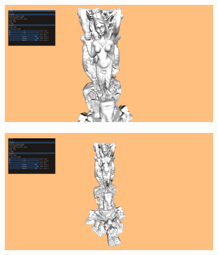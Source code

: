 \begin{figure}[H]
    \centering

    \begin{subfigure}{.45\textwidth}
        \includegraphics[width=\textwidth]{pics/example-0.png}
    \end{subfigure}
    \begin{subfigure}{.45\textwidth}
        \includegraphics[width=\textwidth]{pics/example-1.png}
    \end{subfigure}

    \medskip


\end{figure}
